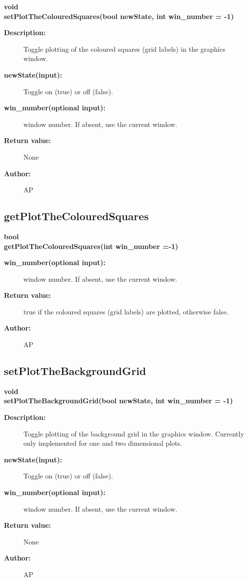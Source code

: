\begin{flushleft} \textbf{%
void  \\ 
\settowidth{\GLGraphicsInterfaceIncludeArgIndent}{setPlotTheColouredSquares(}%
setPlotTheColouredSquares(bool newState, int win\_number  = -1) 
}\end{flushleft}
\begin{description}
\item[{\bf Description:}] 
 Toggle plotting of the coloured squares (grid labels) in the graphics window.
\item[{\bf newState(input):}]  Toggle on (true) or off (false).
\item[{\bf win\_number(optional input):}]  window number. If absent, use the current window.

\item[{\bf Return value:}]  None
\item[{\bf Author:}]  AP
\end{description}
\subsection{getPlotTheColouredSquares}
 
\begin{flushleft} \textbf{%
bool  \\ 
\settowidth{\GLGraphicsInterfaceIncludeArgIndent}{getPlotTheColouredSquares(}%
getPlotTheColouredSquares(int win\_number  =-1)
}\end{flushleft}
\begin{description}
\item[{\bf win\_number(optional input):}]  window number. If absent, use the current window.

\item[{\bf Return value:}]  true if the coloured squares (grid labels) are plotted, otherwise false.
\item[{\bf Author:}]  AP
\end{description}
\subsection{setPlotTheBackgroundGrid}
 
\begin{flushleft} \textbf{%
void  \\ 
\settowidth{\GLGraphicsInterfaceIncludeArgIndent}{setPlotTheBackgroundGrid(}%
setPlotTheBackgroundGrid(bool newState, int win\_number  = -1) 
}\end{flushleft}
\begin{description}
\item[{\bf Description:}] 
 Toggle plotting of the background grid in the graphics window. Currently only implemented for
 one and two dimensional plots.
\item[{\bf newState(input):}]  Toggle on (true) or off (false).
\item[{\bf win\_number(optional input):}]  window number. If absent, use the current window.

\item[{\bf Return value:}]  None
\item[{\bf Author:}]  AP
\end{description}
